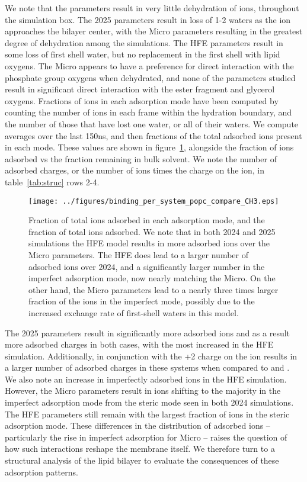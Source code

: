 We note that the  parameters result in very little dehydration of ions, throughout the simulation box. The 2025 parameters result in loss of 1-2 waters as the ion approaches the bilayer center, with the  Micro parameters resulting in the greatest degree of dehydration among the \mg{} simulations.
The  HFE parameters result in some loss of first shell water, but no replacement in the first shell with lipid oxygens.
The  Micro appears to have a preference for direct interaction with the phosphate group oxygens when dehydrated, and none of the \mg{} parameters studied result in significant direct interaction with the ester fragment and glycerol oxygens.
Fractions of ions in each adsorption mode have been computed by counting the number of ions in each frame within the hydration boundary, and the number of those that have lost one water, or all of their waters. We compute averages over the last 150ns, and then
fractions of the total adsorbed ions present in each mode. These values are shown in figure~\ref{fig:adfrac}, alongside the fraction of ions adsorbed vs the fraction remaining in bulk solvent. We note the
number of adsorbed charges, or the number of ions times the charge on the ion, in table~\ref{tab:struc} rows 2-4.
\begin{figure}[H]
    \caption[Adsorption mode fractions]{Fraction of total ions adsorbed in each adsorption mode, and the fraction of total ions adsorbed. We note
        that in both 2024 and 2025 simulations the HFE model results in more adsorbed ions over the \mg{} Micro parameters.
    The  HFE does lead to a larger number of adsorbed ions over 2024, and a significantly larger number in the imperfect
    adsorption mode, now nearly matching the  Micro. On the other hand, the  Micro parameters lead to a nearly three times
    larger fraction of the ions in the imperfect mode, possibly due to the increased exchange rate of first-shell waters in this
    model.}
    \label{fig:adfrac}
    \texttt{[image: ../figures/binding\_per\_system\_popc\_compare\_CH3.eps]}
\end{figure}
The 2025 parameters result in significantly more adsorbed ions and as a result more adsorbed charges in both cases, with the most increased in the  HFE simulation.
Additionally,  in conjunction
with the +2 charge on the \mg{} ion results in a larger number of adsorbed charges in these systems when compared to \na{} and \li{}.
We also note an increase in imperfectly adsorbed ions in the  HFE simulation. However, the  Micro parameters result in ions shifting to the majority in the imperfect
adsorption mode from the steric mode seen in both 2024 simulations.
The  HFE parameters still remain with the largest fraction of ions in the steric adsorption mode.
These differences in the distribution of adsorbed \mg{} ions -- particularly the rise in imperfect adsorption for  Micro --
raises the question of how such interactions reshape the membrane itself. We therefore turn to a structural analysis of the lipid bilayer
to evaluate the consequences of these adsorption patterns.


